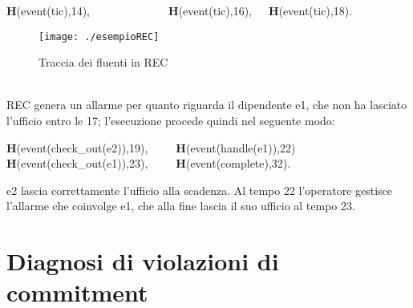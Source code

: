 \documentclass[a4paper,12pt]{report}
\begin{document}
\textbf{H}(event(tic),14),\ \ \ \ \ \ \ \ \ \  \ \ \ \ \textbf{H}(event(tic),16),\ \ \  \textbf{H}(event(tic),18).
\begin{figure}[h]
\begin{center}
    \texttt{[image: ./esempioREC]}
    \caption{Traccia dei fluenti in REC}
    \label{REC}
\end{center}
\end{figure}
\\REC genera un allarme per quanto riguarda il dipendente e1, che non ha lasciato l'ufficio entro le 17; l'esecuzione procede quindi nel seguente modo:
\begin{center}
\textbf{H}(event(check\_out(e2)),19),\ \ \ \ \ \textbf{H}(event(handle(e1)),22)\\
\textbf{H}(event(check\_out(e1)),23),\ \ \ \ \ \textbf{H}(event(complete),32).
\end{center}
e2 lascia correttamente l'ufficio alla scadenza. Al tempo 22 l'operatore gestisce l'allarme che coinvolge e1, che alla fine lascia il suo ufficio al tempo 23.
\chapter{Diagnosi di violazioni di commitment}
\end{document}
